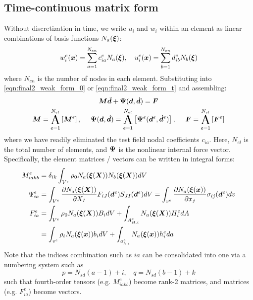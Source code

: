 \subsection{Time-continuous matrix form}
Without discretization in time, we write $u_i$ and $w_i$ within an element as linear combinations of basis functions $N_a(\bm{\xi})$:
\begin{equation}
    w_i^e (\bm{x}) = \sum_{a=1}^{N_{en}} c_{ia}^e N_a(\bm{\xi}), \quad u_i^e (\bm{x}) = \sum_{b=1}^{N_{en}} d_{ib}^e N_b(\bm{\xi})
\end{equation}
where $N_{en}$ is the number of nodes in each element. 
Substituting into \cref{eqn:final2_weak_form_0} or \cref{eqn:final2_weak_form_t} and assembling:
\begin{equation}\label{eqn:final2_eom}
\begin{gathered}
    \bt{M} \ddot{\bv{d}} + \bv{\Psi} (\bv{d}, \dot{\bv{d}}) = \bv{F}  \\
    \bt{M} = \assem_{e=1}^{N_{el}} \left[ \bt{M}^e \right], ~~~~ \bv{\Psi}(\bv{d}, \dot{\bv{d}}) = \assem_{e=1}^{N_{el}} \left[ \bv{\Psi}^e(\bv{d}^e, \dot{\bv{d}}^e) \right], ~~~~ \bv{F} = \assem_{e=1}^{N_{el}} \left[ \bv{F}^e \right]
\end{gathered}
\end{equation} 
where we have readily eliminated the test field nodal coefficients $c_{ia}$.
Here, $N_{el}$ is the total number of elements, and $\bm{\Psi}$ is the nonlinear internal force vector. 
Specifically, the element matrices / vectors can be written in integral forms: 
\begin{equation}\label{eqn:final2_element_matrices}
\begin{aligned}
    M_{iakb}^e &= \delta_{ik} \int_{V^e} \rho_0 N_a(\bm{\xi}(\bm{X})) N_b(\bm{\xi}(\bm{X})) dV \\
    \Psi_{ia}^e &= \int_{V^e} \frac{\partial N_a(\bm{\xi}(\bm{X}))}{\partial X_I} F_{iJ}(\bm{d}^e) S_{JI}(\bm{d}^e) dV  = \int_{v^e} \frac{\partial N_a(\bm{\xi} (\bm{x}))}{\partial x_j} \sigma_{ij}(\bm{d}^e) dv \\
    F_{ia}^e &= \int_{V^e} \rho_0 N_a(\bm{\xi}(\bm{X})) B_i dV + \int_{A_{H,i}^e} N_a(\bm{\xi}(\bm{X})) H_i^e dA \\
    &= \int_{v^e} \rho_t N_a(\bm{\xi}(\bm{x})) b_i dV + \int_{a_{h,i}^e} N_a(\bm{\xi}(\bm{x})) h_i^e da \\
\end{aligned}
\end{equation}
Note that the indices combination such as $ia$ can be consolidated into one via a numbering system such as 
\begin{equation}
p = N_{sd} (a - 1) + i, ~~~~ q = N_{sd} (b - 1) + k
\end{equation}
such that fourth-order tensors (e.g. $M_{iakb}^e$) become rank-2 matrices, and matrices (e.g. $F_{ia}^e$) become vectors.

